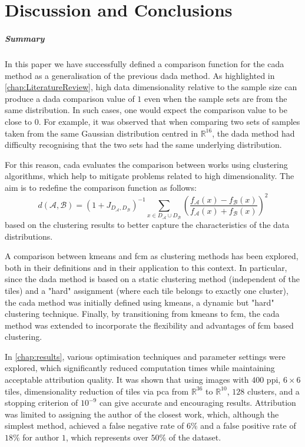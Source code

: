 \chapter{Discussion and Conclusions}
\begin{toReview}
\paragraph{Summary}
In this paper we have successfully defined a comparison function for the \gls{cada} method as a generalisation of the previous \gls{dada} method. As highlighted in \cref{chap:LiteratureReview}, high data dimensionality relative to the sample size can produce a \gls{dada} comparison value of $1$ even when the sample sets are from the same distribution. In such cases, one would expect the comparison value to be close to $0$. For example, it was observed that when comparing two sets of samples taken from the same Gaussian distribution centred in $\mathbb{R}^{16}$, the \gls{dada} method had difficulty recognising that the two sets had the same underlying distribution.

\noindent For this reason, \gls{cada} evaluates the comparison between works using clustering algorithms, which help to mitigate problems related to high dimensionality. The aim is to redefine the comparison function as follows:
\[
	d\left(\mathcal{A}, \mathcal{B}\right) = \left(1+J_{D_\mathcal{A}, D_\mathcal{B}}\right)^{-1}\sum_{x\in D_\mathcal{A}\cup D_\mathcal{B}}\left(\frac{f_\mathcal{A}(x) - f_\mathcal{B}(x)}{f_\mathcal{A}(x) + f_\mathcal{B}(x)}\right)^2
\]
based on the clustering results to better capture the characteristics of the data distributions.

\noindent A comparison between \gls{kmeans} and \gls{fcm} as clustering methods has been explored, both in their definitions and in their application to this context. In particular, since the \gls{dada} method is based on a static clustering method (independent of the tiles) and a "hard" assignment (where each tile belongs to exactly one cluster), the \gls{cada} method was initially defined using \gls{kmeans}, a dynamic but "hard" clustering technique. Finally, by transitioning from \gls{kmeans} to \gls{fcm}, the \gls{cada} method was extended to incorporate the flexibility and advantages of \gls{fcm} based clustering.

\noindent In \cref{chap:results}, various optimisation techniques and parameter settings were explored, which significantly reduced computation times while maintaining acceptable attribution quality. It was shown that using images with $400$ \gls{ppi}, $6\times6$ tiles, dimensionality reduction of tiles via \gls{pca} from $\mathbb{R}^{36}$ to $\mathbb{R}^{10}$, $128$ clusters, and a stopping criterion of $10^{-9}$ can give accurate and encouraging results. Attribution was limited to assigning the author of the closest work, which, although the simplest method, achieved a false negative rate of $6\%$ and a false positive rate of $18\%$ for author $1$, which represents over $50\%$ of the dataset.


\end{toReview}
